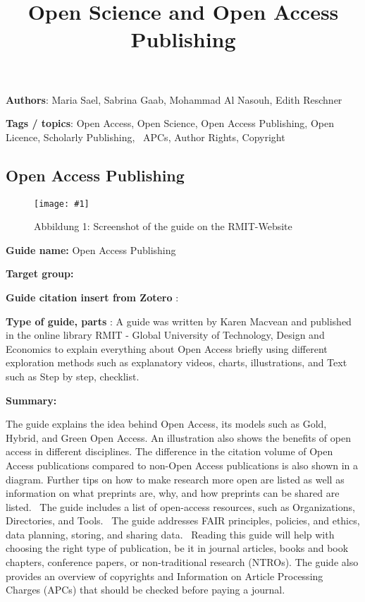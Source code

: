 \documentclass{article}
\newlength{\imgwidth}
\newcommand\scaledgraphics[2]{%
                
\settowidth{\imgwidth}{\texttt{[image: \#1]}}%
                
\setlength{\imgwidth}{\minof{\imgwidth}{#2\textwidth}}%
                
\texttt{[image: \#1]}%
                
}
\begin{document}
\title{Open Science and Open Access Publishing }

\maketitle





\textbf{Authors}: Maria Sael, Sabrina Gaab, Mohammad Al Nasouh, Edith Reschner


\textbf{Tags / topics}: Open Access, Open Science, Open Access Publishing, Open Licence, Scholarly Publishing,  APCs, Author Rights, Copyright





\subsection{Open Access Publishing}\label{H7151279}


\begin{figure}
\scaledgraphics{0aa3f530-e98a-4bee-853d-774836495500.png}{1}
\caption*{Abbildung 1: Screenshot of the guide on the RMIT-Website}\label{F60048931}
\end{figure}





\textbf{Guide name:} Open Access Publishing


\textbf{Target group:} 


\textbf{Guide citation insert from Zotero} :  \autocite{macvean_all_2021} 


\textbf{Type of guide, parts} : A guide was written by Karen Macvean and published in the online library RMIT - Global University of Technology, Design and Economics to explain everything about Open Access briefly using different exploration methods such as explanatory videos, charts, illustrations, and Text such as Step by step, checklist. 


\textbf{Summary:} 


The guide explains the idea behind Open Access, its models such as Gold, Hybrid, and Green Open Access. An illustration also shows the benefits of open access in different disciplines. The difference in the citation volume of Open Access publications compared to non-Open Access publications is also shown in a diagram. Further tips on how to make research more open are listed as well as information on what preprints are, why, and how preprints can be shared are listed.  The guide includes a list of open-access resources, such as Organizations, Directories, and Tools.  The guide addresses FAIR principles, policies, and ethics, data planning, storing, and sharing data.  Reading this guide will help with choosing the right type of publication, be it in journal articles, books and book chapters, conference papers, or non-traditional research (NTROs). The guide also provides an overview of copyrights and Information on Article Processing Charges (APCs) that should be checked before paying a journal.
\end{document}
